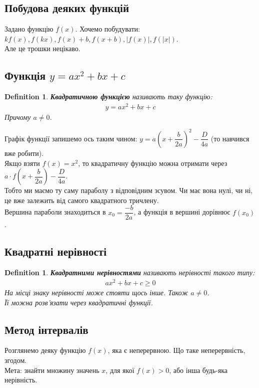 \documentclass[a4paper, 10pt]{article}
\theoremstyle{theoremdd}
\theoremstyle{theoremdd}
\newtheorem{definition}[theorem]{Definition}
\theoremstyle{theoremdd}
\theoremstyle{theoremdd}
\theoremstyle{theoremdd}
\theoremstyle{theoremdd}
\theoremstyle{theoremdd}
\theoremstyle{theoremdd}
\begin{document}
\subsection{Побудова деяких функцій}
Задано функцію $f(x)$. Хочемо побудувати:\\
$kf(x), f(kx), f(x)+b, f(x+b), |f(x)|, f(|x|)$.\\
Але це трошки нецікаво.

\subsection{Функція $y=ax^2+bx+c$}
\begin{definition}
\textbf{Квадратичною функцією} називають таку функцію:
\begin{align*}
y = ax^2+bx+c
\end{align*}
Причому $a \neq 0$.
\end{definition}
Графік функції запишемо ось таким чином: $y = a\left(x + \dfrac{b}{2a} \right)^2 - \dfrac{D}{4a}$ (то навчився вже робити).\\
Якщо взяти $f(x) = x^2$, то квадратичну функцію можна отримати через $a \cdot f\left( x + \dfrac{b}{2a} \right) - \dfrac{D}{4a}$.\\
Тобто ми маємо ту саму параболу з відповідним зсувом. Чи має вона нулі, чи ні, це вже залежить від самого квадратного тричлену.\\
Вершина параболи знаходиться в $x_0 = \dfrac{-b}{2a}$, а функція в вершині дорівнює $f(x_0)$.

\subsection{Квадратні нерівності}
\begin{definition}
\textbf{Квадратними нерівностями} називають нерівності такого типу:
\begin{align*}
ax^2+bx+c \geq 0
\end{align*}
На місці знаку нерівності може стояти щось інше. Також $a \neq 0$.\\
Її можна розв'язати через квадратичні функції.
\end{definition}

\subsection{Метод інтервалів}
Розглянемо деяку функцію $f(x)$, яка є неперервною. Що таке неперервність, згодом.\\
Мета: знайти множину значень $x$, для якої $f(x) > 0$, або інша будь-яка нерівність.
\end{document}
